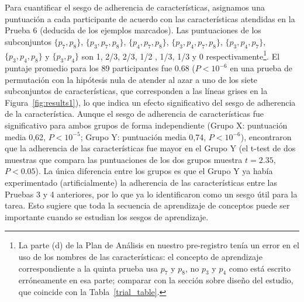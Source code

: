 Para cuantificar el sesgo de adherencia de características, asignamos una puntuación a cada participante de acuerdo con las características atendidas en la Prueba 6 (deducida de los ejemplos marcados). Las puntuaciones de los subconjuntos $ \{p_7, p_8 \} $, $ \{p_3, p_7, p_8 \} $, $ \{p_4, p_7, p_8 \} $, $ \{p_3, p_4, p_7, p_8 \} $, $ \{p_3, p_4, p_7 \} $, $ \{p_3, p_4, p_8 \} $ y $ \{p_3, p_4 \} $ son 1, 2/3, 2/3, 1/2 , 1/3, 1/3 y 0 respectivamente\footnote{La parte (d) de la Plan de Análisis en nuestro pre-registro tenía un error en el uso de los nombres de las características: el concepto de aprendizaje correspondiente a la quinta prueba usa $ p_7 $ y $ p_8 $, no $ p_3 $ y $ p_4 $ como está escrito erróneamente en esa parte; comparar con la sección sobre diseño del estudio, que coincide con la Tabla~\ref{trial_table}.}. El puntaje promedio para los 89 participantes fue 0.68 ($ P <10^{- 6} $ en una prueba de permutación con la hipótesis nula de atender al azar a uno de los siete subconjuntos de características, que corresponden a las líneas grises en la Figura~\ref{fig:results1}), lo que indica un efecto significativo del sesgo de adherencia de la característica. Aunque el sesgo de adherencia de características fue significativo para ambos grupos de forma independiente (Grupo X: puntuación media 0,62, $ P <10^{-5} $; Grupo Y: puntuación media 0,74, $ P <10^{-6} $), encontraron que la adherencia de las características fue mayor en el Grupo Y (el t-test de dos muestras que compara las puntuaciones de los dos grupos muestra $ t = 2.35 $, $ P <0.05 $). La única diferencia entre los grupos es que el Grupo Y ya había experimentado (artificialmente) la adherencia de las características entre las Pruebas 3 y 4 anteriores, por lo que ya lo identificaron como un sesgo útil para la tarea. Esto sugiere que toda la secuencia de aprendizaje de conceptos puede ser importante cuando se estudian los sesgos de aprendizaje.

